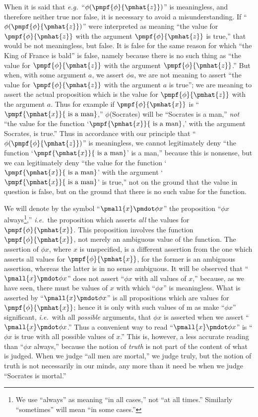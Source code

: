 \documentclass[letterpaper,12pt,openany,leqno]{book}
\newcommand{\pagefirst}[1]{\marginnote[\boxed{\text{#1}}]{\boxed{\text{#1}}}}
\begin{document}
When it is said that \textit{e.g.}\ ``$\phi(\pmpf{\phi}{\pmhat{z}})$'' is meaningless, and therefore neither true nor false, it is necessary to avoid a misunderstanding. If ``$\phi(\pmpf{\phi}{\pmhat{z}})$'' were interpreted as meaning ``the value for $\pmpf{\phi}{\pmhat{z}}$ with the argument $\pmpf{\phi}{\pmhat{z}}$ is true,'' that would be not meaningless, but false. It is false for the same reason for which ``the King of France is bald'' is false, namely because there is no such thing as ``the value for $\pmpf{\phi}{\pmhat{z}}$ with the argument $\pmpf{\phi}{\pmhat{z}}$.'' But when, with some argument $a$, we assert $\phi a$, we are not meaning to assert ``the value for $\pmpf{\phi}{\pmhat{z}}$ with the argument $a$ is true''; we are meaning to assert the actual proposition which is the value for $\pmpf{\phi}{\pmhat{z}}$ with the argument $a$. Thus for example if $\pmpf{\phi}{\pmhat{x}}$ is ``$\pmpf{\pmhat{x}}{\text{ is a man}}$,'' $\phi$(Socrates) will be ``Socrates is a man,'' \textit{not} ``the value for the function `$\pmpf{\pmhat{x}}{\text{ is a man}}$,' with the argument Socrates, is true.'' Thus in accordance with our principle that ``$\phi(\pmpf{\phi}{\pmhat{z}})$'' is meaningless, we cannot legitimately deny ``the function `$\pmpf{\pmhat{x}}{\text{ is a man}}$' is a man,'' because this is nonsense, but we can legitimately deny ``the value for the function `$\pmpf{\pmhat{x}}{\text{ is a man}}$' with the argument `$\pmpf{\pmhat{x}}{\text{ is a man}}$' is true,'' not on the ground that the value in question is false, but on the ground that there is no such value for the function.

We will denote by the symbol ``$\pmall{x}\pmdot \phi x$'' the proposition ``$\phi x$ always\footnote{We use ``always'' as meaning ``in all cases,'' not ``at all times.'' Similarly ``sometimes'' will mean ``in some cases.''},'' \textit{i.e.}\ the proposition which asserts \textit{all} the values for $\pmpf{\phi}{\pmhat{x}}$. This proposition involves the function $\pmpf{\phi}{\pmhat{x}}$, not merely an ambiguous value of the function. The assertion of $\phi x$, where $x$ is unspecified, is a different assertion from the one which asserts all values for $\pmpf{\phi}{\pmhat{x}}$, for the former is an ambiguous assertion, whereas the latter is in no sense ambiguous. It will be observed that ``$\pmall{x}\pmdot \phi x$'' does not assert ``$\phi x$ with all values of $x$,'' because, as we have seen, there must be values of $x$ with which ``$\phi x$'' is meaningless. What is asserted by ``$\pmall{x}\pmdot \phi x$'' is all propositions which are values for $\pmpf{\phi}{\pmhat{x}}$; hence it is \pagefirst{44} only with such values of m as make ``$\phi x$'' significant, \textit{i.e.}\ with all \textit{possible} arguments, that $\phi x$ is asserted when we assert ``$\pmall{x} \pmdot \phi x$.'' Thus a convenient way to read ``$\pmall{x}\pmdot \phi x$'' is ``$\phi x$ is true with all possible values of $x$.'' This is, however, a less accurate reading than ``$\phi x$ always,'' because the notion of \textit{truth} is not part of the content of what is judged. When we judge ``all men are mortal,'' we judge truly, but the notion of truth is not necessarily in our minds, any more than it need be when we judge ``Socrates is mortal.''
\end{document}
